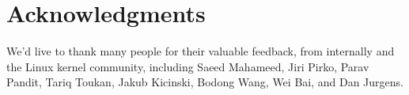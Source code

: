 \documentclass[letterpaper]{article}
\begin{document}
\section{Acknowledgments}
We'd live to thank many people for their valuable feedback, from internally
and the Linux kernel community, including Saeed Mahameed, Jiri Pirko,
Parav Pandit, Tariq Toukan, Jakub Kicinski, Bodong Wang, Wei Bai, and Dan Jurgens.




\end{document}
